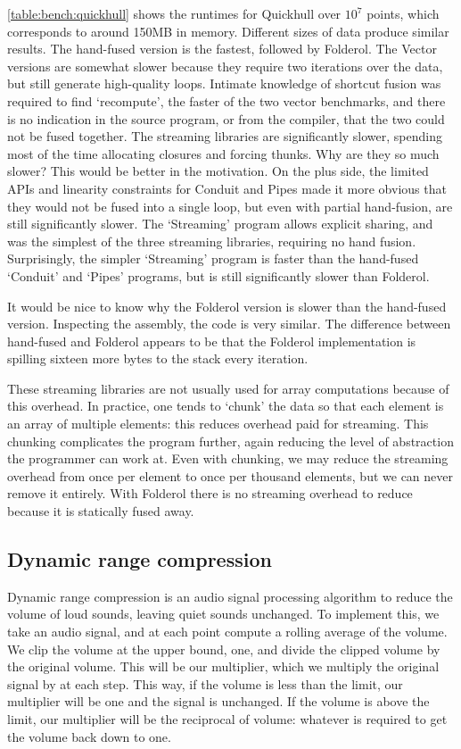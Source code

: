 \autoref{table:bench:quickhull} shows the runtimes for Quickhull over $10^7$ points, which corresponds to around 150MB in memory.
Different sizes of data produce similar results.
The hand-fused version is the fastest, followed by Folderol.
The Vector versions are somewhat slower because they require two iterations over the data, but still generate high-quality loops.
Intimate knowledge of shortcut fusion was required to find `recompute', the faster of the two vector benchmarks, and there is no indication in the source program, or from the compiler, that the two could not be fused together.
The streaming libraries are significantly slower, spending most of the time allocating closures and forcing thunks.
Why are they so much slower? This would be better in the motivation.
On the plus side, the limited APIs and linearity constraints for Conduit and Pipes made it more obvious that they would not be fused into a single loop, but even with partial hand-fusion, are still significantly slower.
The `Streaming' program allows explicit sharing, and was the simplest of the three streaming libraries, requiring no hand fusion.
Surprisingly, the simpler `Streaming' program is faster than the hand-fused `Conduit' and `Pipes' programs, but is still significantly slower than Folderol.

It would be nice to know why the Folderol version is slower than the hand-fused version.
Inspecting the assembly, the code is very similar.
The difference between hand-fused and Folderol appears to be that the Folderol implementation is spilling sixteen more bytes to the stack every iteration.

These streaming libraries are not usually used for array computations because of this overhead.
In practice, one tends to `chunk' the data so that each element is an array of multiple elements: this reduces overhead paid for streaming.
This chunking complicates the program further, again reducing the level of abstraction the programmer can work at.
Even with chunking, we may reduce the streaming overhead from once per element to once per thousand elements, but we can never remove it entirely.
With Folderol there is no streaming overhead to reduce because it is statically fused away.

\subsection{Dynamic range compression}
Dynamic range compression is an audio signal processing algorithm to reduce the volume of loud sounds, leaving quiet sounds unchanged.
To implement this, we take an audio signal, and at each point compute a rolling average of the volume.
We clip the volume at the upper bound, one, and divide the clipped volume by the original volume.
This will be our multiplier, which we multiply the original signal by at each step.
This way, if the volume is less than the limit, our multiplier will be one and the signal is unchanged. 
If the volume is above the limit, our multiplier will be the reciprocal of volume: whatever is required to get the volume back down to one.

